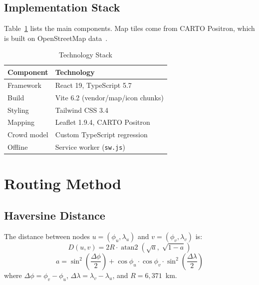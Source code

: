 \documentclass[conference]{IEEEtran}
\begin{document}
\subsection{Implementation Stack}
Table~\ref{tab:tech} lists the main components. Map tiles come from CARTO Positron, which is built on OpenStreetMap data~\cite{osm2026, carto2026}.

\begin{table}[h]
\caption{Technology Stack}
\label{tab:tech}
\centering
\begin{tabular}{ll}
\toprule
\textbf{Component} & \textbf{Technology} \\
\midrule
Framework   & React 19, TypeScript 5.7 \\
Build       & Vite 6.2 (vendor/map/icon chunks) \\
Styling     & Tailwind CSS 3.4 \\
Mapping     & Leaflet 1.9.4, CARTO Positron \\
Crowd model & Custom TypeScript regression \\
Offline     & Service worker (\texttt{sw.js}) \\
\bottomrule
\end{tabular}
\end{table}

\section{Routing Method}

\subsection{Haversine Distance}
The distance between nodes $u = (\phi_u, \lambda_u)$ and $v = (\phi_v, \lambda_v)$ is:
\begin{equation}
D(u,v) = 2R \cdot \operatorname{atan2}\!\left(\sqrt{a},\; \sqrt{1-a}\right)
\label{eq:haversine}
\end{equation}
\begin{equation}
a = \sin^2\!\left(\frac{\Delta\phi}{2}\right) + \cos\phi_u \cdot \cos\phi_v \cdot \sin^2\!\left(\frac{\Delta\lambda}{2}\right)
\end{equation}
where $\Delta\phi = \phi_v - \phi_u$, $\Delta\lambda = \lambda_v - \lambda_u$, and $R = 6{,}371$~km.
\end{document}
